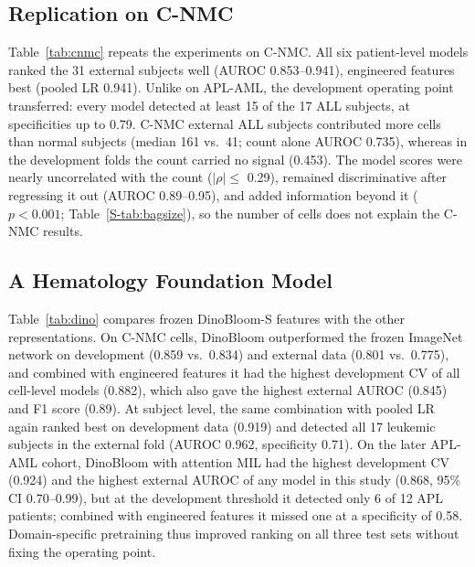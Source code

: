 \documentclass[journal]{IEEEtran}
\begin{document}


\subsection{Replication on C-NMC}
\label{sec:cnmc}
Table~\ref{tab:cnmc} repeats the experiments on C-NMC. All six patient-level models ranked the 31 external subjects well (AUROC 0.853--0.941), engineered features best (pooled LR 0.941). Unlike on APL-AML, the development operating point transferred: every model detected at least 15 of the 17 ALL subjects, at specificities up to 0.79. C-NMC external ALL subjects contributed more cells than normal subjects (median 161 vs.\ 41; count alone AUROC 0.735), whereas in the development folds the count carried no signal (0.453). The model scores were nearly uncorrelated with the count ($|\rho|\le$ 0.29), remained discriminative after regressing it out (AUROC 0.89--0.95), and added information beyond it ($p<0.001$; Table~\ref{S-tab:bagsize}), so the number of cells does not explain the C-NMC results.



\subsection{A Hematology Foundation Model}
\label{sec:dino}
Table~\ref{tab:dino} compares frozen DinoBloom-S features with the other representations. On C-NMC cells, DinoBloom outperformed the frozen ImageNet network on development (0.859 vs.\ 0.834) and external data (0.801 vs.\ 0.775), and combined with engineered features it had the highest development CV of all cell-level models (0.882), which also gave the highest external AUROC (0.845) and F1 score (0.89). At subject level, the same combination with pooled LR again ranked best on development data (0.919) and detected all 17 leukemic subjects in the external fold (AUROC 0.962, specificity 0.71). On the later APL-AML cohort, DinoBloom with attention MIL had the highest development CV (0.924) and the highest external AUROC of any model in this study (0.868, 95\% CI 0.70--0.99), but at the development threshold it detected only 6 of 12 APL patients; combined with engineered features it missed one at a specificity of 0.58. Domain-specific pretraining thus improved ranking on all three test sets without fixing the operating point.
\end{document}
